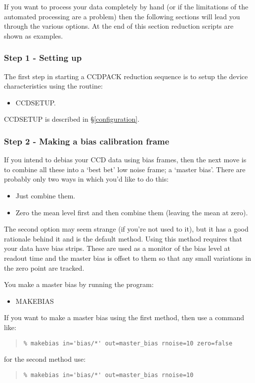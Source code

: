 \documentclass[twoside,11pt]{article}
\newcommand{\hyperref}[4]{#2\ref{#4}#3}
\newcommand{\htmlref}[2]{#1}
\newcommand{\xlabel}[1]{}
\renewcommand{\_}{\texttt{\symbol{95}}}
\newenvironment{myquote}{\begin{quote}\begin{small}}{\end{small}\end{quote}}
\newcommand{\routine}[1]{{\sc #1}}
\newcommand{\xroutine}[1]{\htmlref{{\sc #1}}{#1}}
\begin{document}
If you want to process your data completely by hand (or if the
limitations of the automated processing are a problem) then the
following sections will lead you through the various options. At the
end of this section reduction scripts are shown as examples.

\subsubsection{Step 1 - Setting up}
The first step in starting a CCDPACK reduction sequence is to setup
the device characteristics using the routine:
\begin{itemize}
\item \xroutine{CCDSETUP}.
\end{itemize}
\routine{CCDSETUP} is described \hyperref{elsewhere}{in \S}{}{configuration}.

\subsubsection{Step 2 - Making a bias calibration frame \xlabel{masterbias}
               \label{masterbias}}
If you intend to debias your CCD data using bias frames, then the next
move is to combine all these into a `best bet' low noise frame; a
`master bias'. There are probably only two ways in which you'd like to
do this:
\begin{itemize}
\item Just combine them.
\item Zero the mean level first and then combine them (leaving the
mean at zero).
\end{itemize}

The second option may seem strange (if you're not used to it), but it
has a good rationale behind it and is the default method. Using this
method requires that your data have bias strips.
These are used as a monitor of the bias level at readout time and the
master bias is offset to them so that any small variations in the zero
point are tracked.

You make a master bias by running the program:
\begin{itemize}
\item \xroutine{MAKEBIAS}
\end{itemize}
If you want to make a master bias using the first method, then use a
command like:
\begin{myquote}
\begin{verbatim}
% makebias in='bias/*' out=master_bias rnoise=10 zero=false
\end{verbatim}
\end{myquote}
for the second method use:
\begin{myquote}
\begin{verbatim}
% makebias in='bias/*' out=master_bias rnoise=10
\end{verbatim}
\end{myquote}
\end{document}
